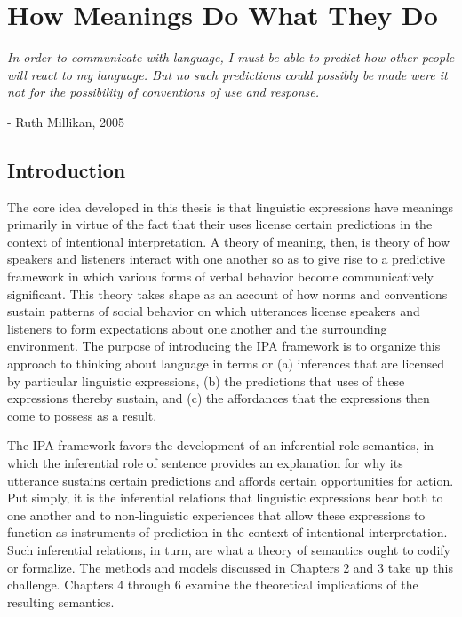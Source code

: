 
\chapter{How Meanings Do What They Do}
\renewcommand{\epigraphrule}{0pt}
\setlength{\epigraphwidth}{4.5in}
\epigraph{\textit{In order to communicate with language, I must be able to predict how other people will react to my language. But no such predictions could possibly be made were it not for the possibility of conventions of use and response.}}{- Ruth Millikan, 2005}

\section{Introduction}

The core idea developed in this thesis is that linguistic expressions have meanings primarily in virtue of the fact that their uses license certain predictions in the context of intentional interpretation. A theory of meaning, then, is theory of how speakers and listeners interact with one another so as to give rise to a predictive framework in which various forms of verbal behavior become communicatively significant. This theory takes shape as an account of how norms and conventions sustain patterns of social behavior on which utterances license speakers and listeners to form expectations about one another and the surrounding environment. The purpose of introducing the IPA framework is to organize this approach to thinking about language in terms or (a) inferences that are licensed by particular linguistic expressions, (b) the predictions that uses of these expressions thereby sustain, and (c) the affordances that the expressions then come to possess as a result.

The IPA framework favors the development of an inferential role semantics, in which the inferential role of sentence provides an explanation for why its utterance sustains certain predictions and affords certain opportunities for action. Put simply, it is the inferential relations that linguistic expressions bear both to one another and to non-linguistic experiences that allow these expressions to function as instruments of prediction in the context of intentional interpretation. Such inferential relations, in turn, are what a theory of semantics ought to codify or formalize. The methods and models discussed in Chapters 2 and 3 take up this challenge. Chapters 4 through 6 examine the theoretical implications of the resulting semantics. 

